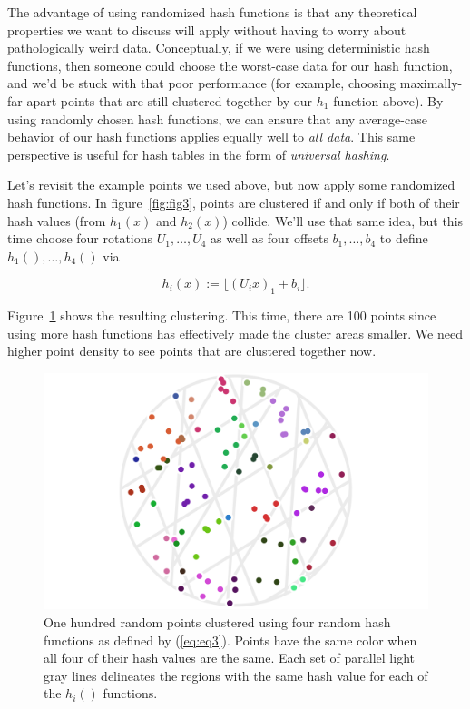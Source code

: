 \documentclass[20pt,]{extarticle}
\begin{document}
The advantage of using randomized hash functions is that any theoretical
properties we want to discuss will apply without having to worry about
pathologically weird data. Conceptually, if we were using deterministic
hash functions, then someone could choose the worst-case data for our
hash function, and we'd be stuck with that poor performance (for
example, choosing maximally-far apart points that are still clustered
together by our \(h_1\) function above). By using randomly chosen hash
functions, we can ensure that any average-case behavior of our hash
functions applies equally well to \emph{all data}. This same perspective
is useful for hash tables in the form of \emph{universal hashing}.

Let's revisit the example points we used above, but now apply some
randomized hash functions. In figure~\ref{fig:fig3}, points are
clustered if and only if both of their hash values (from \(h_1(x)\) and
\(h_2(x)\)) collide. We'll use that same idea, but this time choose four
rotations \(U_1, \ldots, U_4\) as well as four offsets
\(b_1, \ldots, b_4\) to define \(h_1(), \ldots, h_4()\) via

\begin{equation} h_i(x) := \lfloor (U_i x)_1 + b_i \rfloor. \label{eq:eq3}\end{equation}

Figure~\ref{fig:fig4} shows the resulting clustering. This time, there
are 100 points since using more hash functions has effectively made the
cluster areas smaller. We need higher point density to see points that
are clustered together now.

\begin{figure}
\centering
\includegraphics{images/lsh_image4.png}
\caption{One hundred random points clustered using four random hash
functions as defined by (\ref{eq:eq3}). Points have the same color when
all four of their hash values are the same. Each set of parallel light
gray lines delineates the regions with the same hash value for each of
the \(h_i()\) functions.}\label{fig:fig4}
\end{figure}
\end{document}
